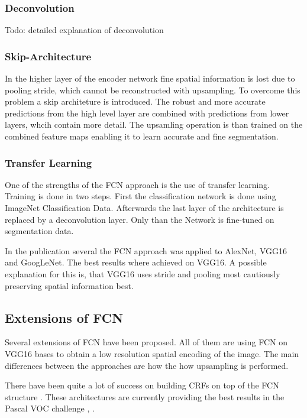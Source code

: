 \subsubsection{Deconvolution} 


Todo: detailed explanation of deconvolution


\subsubsection{Skip-Architecture}

In the higher layer of the encoder network fine spatial information is lost due to pooling stride, which cannot be reconstructed with upsampling. To overcome this problem a skip architeture is introduced. The robust and more accurate predictions from the high level layer are combined with predictions from lower layers, whcih contain more detail. The upsamling operation is than trained on the combined feature maps enabling it to learn accurate and fine segmentation.


\subsubsection{Transfer Learning} One of the strengths of the FCN approach is the use of transfer learning. Training is done in two steps. First the classification network is done using ImageNet Classification Data. Afterwards the last layer of the architecture is replaced by a deconvolution layer. Only than the Network is fine-tuned on segmentation data.


In the publication several the FCN approach was applied to AlexNet, VGG16 and GoogLeNet. The best results where achieved on VGG16. A possible explanation for this is, that VGG16 uses stride and pooling most cautiously preserving spatial information best.




\subsection{Extensions of FCN}

Several extensions of FCN have been proposed. All of them are using FCN on VGG16 bases to obtain a low resolution spatial encoding of the image. The main differences between the approaches are how the how upsampling is performed. 

There have been quite a lot of success on building \Glspl{CRF} on top of the FCN structure \cite{CRF1}. These architectures are currently providing the best results in the Pascal VOC challenge \cite{CRF2}, \cite{CRF4}. 

